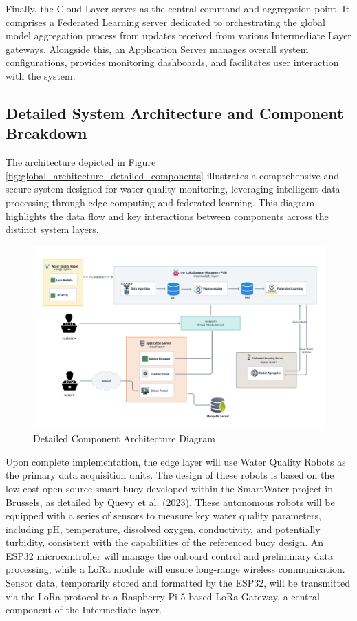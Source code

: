 Finally, the Cloud Layer serves as the central command and aggregation point. It comprises a Federated Learning server dedicated to orchestrating the global model aggregation process from updates received from various Intermediate Layer gateways. Alongside this, an Application Server manages overall system configurations, provides monitoring dashboards, and facilitates user interaction with the system.


\subsection{Detailed System Architecture and Component Breakdown} %
\label{ssec:detailed_architecture_components}

The architecture depicted in Figure \ref{fig:global_architecture_detailed_components} illustrates a comprehensive and secure system designed for water quality monitoring, leveraging intelligent data processing through edge computing and federated learning. This diagram highlights the data flow and key interactions between components across the distinct system layers.

\begin{figure}[H]
    \centering
    \includegraphics[width=0.75\linewidth]{Figures/GArchi1.png}
    \caption{Detailed Component Architecture Diagram}
    \label{fig:enter-label}
\end{figure}



Upon complete implementation, the edge layer will use Water Quality Robots as the primary data acquisition units. The design of these robots is based on the low-cost open-source smart buoy developed within the SmartWater project in Brussels, as detailed by Quevy et al. (2023). These autonomous robots will be equipped with a series of sensors to measure key water quality parameters, including pH, temperature, dissolved oxygen, conductivity, and potentially turbidity, consistent with the capabilities of the referenced buoy design. An ESP32 microcontroller will manage the onboard control and preliminary data processing, while a LoRa module will ensure long-range wireless communication. Sensor data, temporarily stored and formatted by the ESP32, will be transmitted via the LoRa protocol to a Raspberry Pi 5-based LoRa Gateway, a central component of the Intermediate layer.

